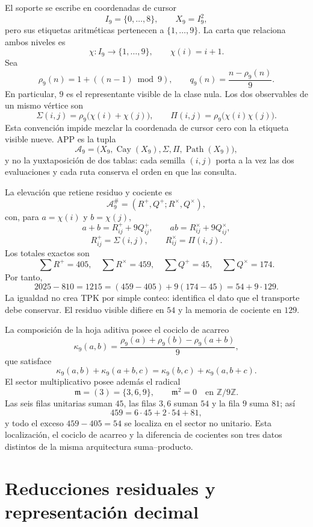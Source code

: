 El soporte se escribe en coordenadas de cursor
\[
 I_9=\{0,\ldots,8\},\qquad X_9=I_9^2,
\]
pero sus etiquetas aritm\'eticas pertenecen a \(\{1,\ldots,9\}\). La carta
que relaciona ambos niveles es
\[
 \chi:I_9\longrightarrow\{1,\ldots,9\},\qquad \chi(i)=i+1.
\]
Sea
\[
 \rho_9(n)=1+((n-1)\bmod9),\qquad
 q_9(n)=\frac{n-\rho_9(n)}9.
\]
En particular, \(9\) es el representante visible de la clase nula. Los dos
observables de un mismo v\'ertice son
\[
 \Sigma(i,j)=\rho_9\bigl(\chi(i)+\chi(j)\bigr),\qquad
 \Pi(i,j)=\rho_9\bigl(\chi(i)\chi(j)\bigr).
\]
Esta convenci\'on impide mezclar la coordenada de cursor cero con la etiqueta
visible nueve. APP es la tupla
\[
 \mathcal A_9=
 \bigl(X_9,\operatorname{Cay}(X_9),\Sigma,\Pi,
       \operatorname{Path}(X_9)\bigr),
\]
y no la yuxtaposici\'on de dos tablas: cada semilla \((i,j)\) porta a la vez
las dos evaluaciones y cada ruta conserva el orden en que las consulta.

La elevaci\'on que retiene residuo y cociente es
\[
 \mathcal A_9^\#=(R^+,Q^+;R^\times,Q^\times),
\]
con, para \(a=\chi(i)\) y \(b=\chi(j)\),
\[
 a+b=R^+_{ij}+9Q^+_{ij},\qquad
 ab=R^\times_{ij}+9Q^\times_{ij},
\]
\[
 R^+_{ij}=\Sigma(i,j),\qquad R^\times_{ij}=\Pi(i,j).
\]
Los totales exactos son
\[
 \sum R^+=405,\quad \sum R^\times=459,\quad
 \sum Q^+=45,\quad \sum Q^\times=174.
\]
Por tanto,
\[
 2025-810=1215=(459-405)+9(174-45)=54+9\cdot129.
\]
La igualdad no crea TPK por simple conteo: identifica el dato que el
transporte debe conservar. El residuo visible difiere en \(54\) y la memoria
de cociente en \(129\).

La composici\'on de la hoja aditiva posee el cociclo de acarreo
\[
 \kappa_9(a,b)=
 \frac{\rho_9(a)+\rho_9(b)-\rho_9(a+b)}9,
\]
que satisface
\[
 \kappa_9(a,b)+\kappa_9(a+b,c)
 =\kappa_9(b,c)+\kappa_9(a,b+c).
\]
El sector multiplicativo posee adem\'as el radical
\[
 \mathfrak m=(3)=\{3,6,9\},\qquad \mathfrak m^2=0
 \quad\text{en }\mathbb Z/9\mathbb Z.
\]
Las seis filas unitarias suman \(45\), las filas \(3,6\) suman \(54\) y
la fila \(9\) suma \(81\); as\'i
\[
 459=6\cdot45+2\cdot54+81,
\]
y todo el exceso \(459-405=54\) se localiza en el sector no unitario. Esta
localizaci\'on, el cociclo de acarreo y la diferencia de cocientes son tres
datos distintos de la misma arquitectura suma--producto.
\fi

\section{Reducciones residuales y representación decimal}

